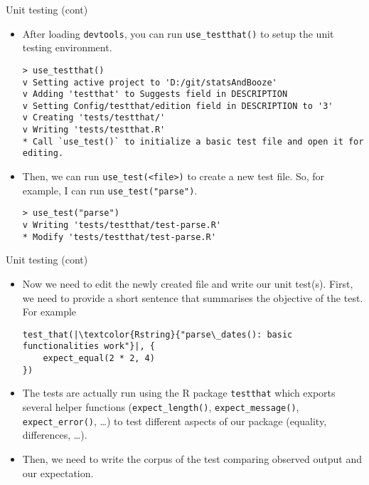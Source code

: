 \documentclass[
hyperref={bookmarks=false},
xcolor={dvipsnames,svgnames*,x11names*}, 
12pt
]{beamer}
\begin{document}
\begin{frame}[fragile]{Unit testing (cont)}
\vspace{-0.5cm}
\begin{itemize}
\itemsep 1ex
\item After loading \texttt{devtools}, you can run \texttt{use\_testthat()} to setup the unit testing environment. 
\begin{lstlisting}
> use_testthat()
v Setting active project to 'D:/git/statsAndBooze'
v Adding 'testthat' to Suggests field in DESCRIPTION
v Setting Config/testthat/edition field in DESCRIPTION to '3'
v Creating 'tests/testthat/'
v Writing 'tests/testthat.R'
* Call `use_test()` to initialize a basic test file and open it for editing.
\end{lstlisting}
\item Then, we can run \texttt{use\_test(\textcolor{Rstring}{<file>})} to create a new test file. So, for example, I can run \texttt{use\_test(\textcolor{Rstring}{"parse"})}. 
\begin{lstlisting}
> use_test("parse")
v Writing 'tests/testthat/test-parse.R'
* Modify 'tests/testthat/test-parse.R'
\end{lstlisting}
\end{itemize}
\end{frame}

\begin{frame}[fragile]{Unit testing (cont)}
\vspace{-0.5cm}
\begin{itemize}
\itemsep 2ex
\item Now we need to edit the newly created file and write our unit test(s). First, we need to provide a short sentence that summarises the objective of the test. For example
\begin{lstlisting}
test_that(|\textcolor{Rstring}{"parse\_dates(): basic functionalities work"}|, {
	expect_equal(2 * 2, 4)
})
\end{lstlisting}
\item The tests are actually run using the R package \texttt{testthat} which exports several helper functions (\texttt{expect\_length()}, \texttt{expect\_message()}, \texttt{expect\_error()}, \dots) to test different aspects of our package (equality, differences, \dots).
\item Then, we need to write the corpus of the test comparing observed output and our expectation. 
\end{itemize}
\end{frame}
\end{document}
